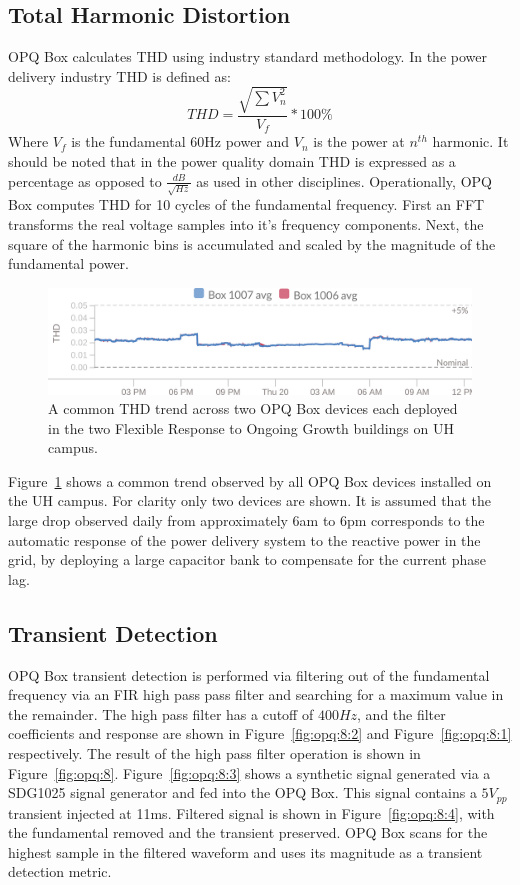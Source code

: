 \subsection{Total Harmonic Distortion}\label{subsec:thd}
OPQ Box calculates THD using industry standard methodology.
In the power delivery industry THD is defined as:
\begin{equation} \label{eq:4}
THD = \frac{\sqrt{\sum{V_{n}^2}}}{V_{f}}*100\%
\end{equation}
Where $V_{f}$ is the fundamental 60Hz power and $V_{n}$ is the power at $n^{th}$ harmonic.
It should be noted that in the power quality domain THD is expressed as a percentage as opposed to $\frac{dB}{\sqrt{Hz}}$ as used in other disciplines.
Operationally, OPQ Box computes THD for 10 cycles of the fundamental frequency.
First an FFT transforms the real voltage samples into it's frequency components.
Next, the square of the harmonic bins is accumulated and scaled by the magnitude of the fundamental power.

\begin{figure}[h]
	\centering
	\includegraphics[width=1\linewidth]{img/thd_two_devices_24_hours.png}
	\caption{A common THD trend across two OPQ Box devices each deployed in the two Flexible Response to Ongoing Growth buildings on UH campus.}
	\label{fig:opq:7}
\end{figure}

Figure~\ref{fig:opq:7} shows a common trend observed by all OPQ Box devices installed on the UH campus.
For clarity only two devices are shown.
It is assumed that the large drop observed daily from approximately 6am to 6pm corresponds to the automatic response of the power delivery system to the reactive power in the grid, by deploying a large capacitor bank to compensate for the current phase lag.

\subsection{Transient Detection}\label{subsec:transient-detection}

OPQ Box transient detection is performed via filtering out of the fundamental frequency via an FIR high pass pass filter and searching for a maximum value in the remainder.
The high pass filter has a cutoff of $400Hz$, and the filter coefficients and response are shown in Figure~\ref{fig:opq:8:2} and Figure~\ref{fig:opq:8:1} respectively.
The result of the high pass filter operation is shown in Figure~\ref{fig:opq:8}.
Figure~\ref{fig:opq:8:3} shows a synthetic signal generated via a SDG1025 signal generator and fed into the OPQ Box.
This signal contains a $5V_{pp}$ transient injected at 11ms.
Filtered signal is shown in Figure~\ref{fig:opq:8:4}, with the fundamental removed and the transient preserved.
OPQ Box scans for the highest sample in the filtered waveform and uses its magnitude as a transient detection metric.


